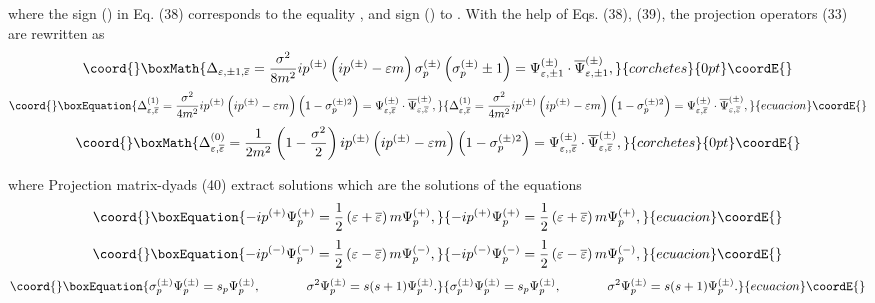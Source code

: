 \documentclass[a4paper,12pt]{article}
\begin{document}
where the sign (\myHighlight{$+$}\coordHE{}) in Eq. (38) corresponds to the equality
\myHighlight{$\varepsilon = \overline{\varepsilon }$}\coordHE{}, and sign (\myHighlight{$-$}\coordHE{}) to
\myHighlight{$\varepsilon =-\overline{ \varepsilon }$}\coordHE{}. With the help of Eqs.
(38), (39), the projection operators (33) are rewritten as
\[\coord{}\boxMath{
\Delta _{\varepsilon ,\pm 1,\overline{\varepsilon }}=\frac{\sigma
^2}{8m^2} ip^{(\pm )}\left( ip^{(\pm )}-\varepsilon m\right)
\sigma _p^{(\pm )}\left( \sigma _p^{(\pm )}\pm 1\right) =\Psi
_{\varepsilon ,\pm 1}^{(\pm )}\cdot \overline{\Psi }_{\varepsilon
,\pm 1}^{(\pm )} ,
}{corchetes}{0pt}\coordE{}\]
\begin{equation}\coord{}\boxEquation{
\Delta _{\varepsilon ,\overline{\varepsilon }}^{(1)}=\frac{\sigma
^2}{4m^2} ip^{(\pm )}\left( ip^{(\pm )}-\varepsilon m\right)
\left( 1-\sigma _p^{(\pm )2}\right) =\Psi _{\varepsilon
,\overline{\varepsilon }}^{(\pm )}\cdot \overline{\Psi
}_{\varepsilon ,\overline{\varepsilon }}^{(\pm )} ,\label{40}
}{
\Delta _{\varepsilon ,\overline{\varepsilon }}^{(1)}=\frac{\sigma
^2}{4m^2} ip^{(\pm )}\left( ip^{(\pm )}-\varepsilon m\right)
\left( 1-\sigma _p^{(\pm )2}\right) =\Psi _{\varepsilon
,\overline{\varepsilon }}^{(\pm )}\cdot \overline{\Psi
}_{\varepsilon ,\overline{\varepsilon }}^{(\pm )} ,}{ecuacion}\coordE{}\end{equation}
\[\coord{}\boxMath{
\Delta _{\varepsilon ,\overline{\varepsilon }}^{(0)}=\frac
1{2m^2}\left( 1- \frac{\sigma ^2}2\right) ip^{(\pm )}\left(
ip^{(\pm )}-\varepsilon m\right) \left( 1-\sigma _p^{(\pm
)2}\right) =\Psi _{\varepsilon ,,\overline{ \varepsilon }}^{(\pm
)}\cdot \overline{\Psi }_{\varepsilon ,\overline{ \varepsilon
}}^{(\pm )} ,
}{corchetes}{0pt}\coordE{}\]

where \coordHE{} Projection matrix-dyads (40)
extract solutions \coordHE{} which are the solutions of the
equations
\begin{equation}\coord{}\boxEquation{
-ip^{(+)}\Psi _p^{(+)}=\frac 12\left( \varepsilon
+\overline{\varepsilon } \right) m\Psi _p^{(+)} , \label{41}
}{
-ip^{(+)}\Psi _p^{(+)}=\frac 12\left( \varepsilon
+\overline{\varepsilon } \right) m\Psi _p^{(+)} , }{ecuacion}\coordE{}\end{equation}
\begin{equation}\coord{}\boxEquation{
-ip^{(-)}\Psi _p^{(-)}=\frac 12\left( \varepsilon
-\overline{\varepsilon } \right) m\Psi _p^{(-)} , \label{42}
}{
-ip^{(-)}\Psi _p^{(-)}=\frac 12\left( \varepsilon
-\overline{\varepsilon } \right) m\Psi _p^{(-)} , }{ecuacion}\coordE{}\end{equation}
\begin{equation}\coord{}\boxEquation{
\sigma _p^{(\pm )}\Psi _p^{(\pm )}=s_p\Psi _p^{(\pm )} ,
\hspace{0.5in}\sigma ^2\Psi _p^{(\pm )}=s(s+1)\Psi _p^{(\pm )} .
\label{43}
}{
\sigma _p^{(\pm )}\Psi _p^{(\pm )}=s_p\Psi _p^{(\pm )} ,
\hspace{0.5in}\sigma ^2\Psi _p^{(\pm )}=s(s+1)\Psi _p^{(\pm )} .
}{ecuacion}\coordE{}\end{equation}
\end{document}
